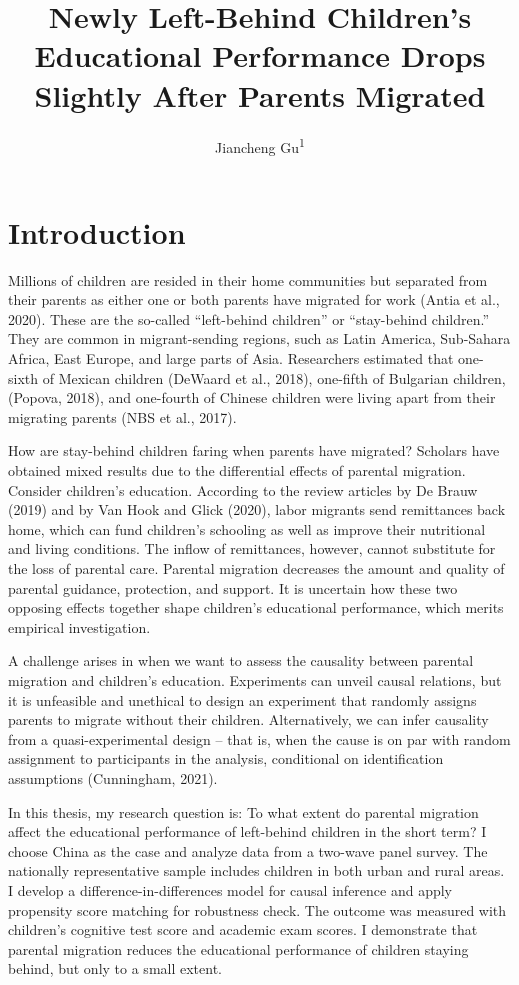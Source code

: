 \documentclass[
  man,floatsintext]{apa7}
\title{Newly Left-Behind Children's Educational Performance Drops Slightly After Parents Migrated}
\author{Jiancheng Gu\textsuperscript{1}}
\date{}
\affiliation{\vspace{0.5cm}\textsuperscript{1} Faculty of Social Sciences, Vrije Universiteit Amsterdam}
\begin{document}
\maketitle

\hypertarget{introduction}{%
\section{Introduction}\label{introduction}}

Millions of children are resided in their home communities but separated from their parents as either one or both parents have migrated for work (Antia et al., 2020). These are the so-called ``left-behind children'' or ``stay-behind children.'' They are common in migrant-sending regions, such as Latin America, Sub-Sahara Africa, East Europe, and large parts of Asia. Researchers estimated that one-sixth of Mexican children (DeWaard et al., 2018), one-fifth of Bulgarian children, (Popova, 2018), and one-fourth of Chinese children were living apart from their migrating parents (NBS et al., 2017).

How are stay-behind children faring when parents have migrated? Scholars have obtained mixed results due to the differential effects of parental migration. Consider children's education. According to the review articles by De Brauw (2019) and by Van Hook and Glick (2020), labor migrants send remittances back home, which can fund children's schooling as well as improve their nutritional and living conditions. The inflow of remittances, however, cannot substitute for the loss of parental care. Parental migration decreases the amount and quality of parental guidance, protection, and support. It is uncertain how these two opposing effects together shape children's educational performance, which merits empirical investigation.

A challenge arises in when we want to assess the causality between parental migration and children's education. Experiments can unveil causal relations, but it is unfeasible and unethical to design an experiment that randomly assigns parents to migrate without their children. Alternatively, we can infer causality from a quasi-experimental design -- that is, when the cause is on par with random assignment to participants in the analysis, conditional on identification assumptions (Cunningham, 2021).

In this thesis, my research question is: To what extent do parental migration affect the educational performance of left-behind children in the short term? I choose China as the case and analyze data from a two-wave panel survey. The nationally representative sample includes children in both urban and rural areas. I develop a difference-in-differences model for causal inference and apply propensity score matching for robustness check. The outcome was measured with children's cognitive test score and academic exam scores. I demonstrate that parental migration reduces the educational performance of children staying behind, but only to a small extent.
\end{document}
